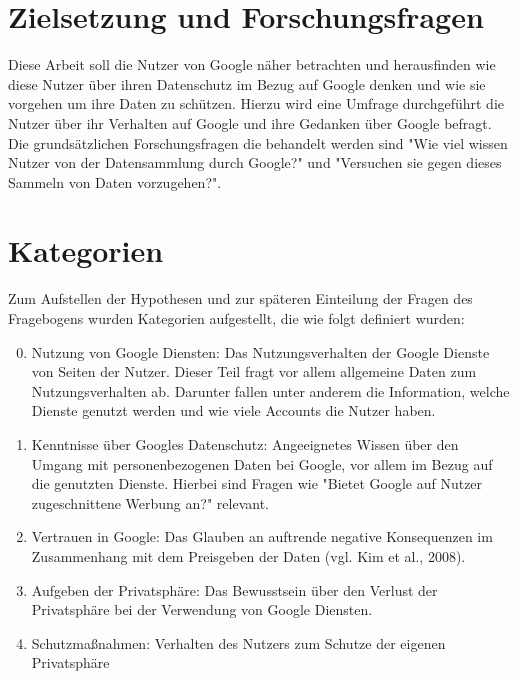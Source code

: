 \section{Zielsetzung und Forschungsfragen}
Diese Arbeit soll die Nutzer von Google näher betrachten und herausfinden wie diese Nutzer über ihren Datenschutz im Bezug auf Google denken und wie sie vorgehen um ihre Daten zu schützen. Hierzu wird eine Umfrage durchgeführt die Nutzer über ihr Verhalten auf Google und ihre Gedanken über Google befragt.
Die grundsätzlichen Forschungsfragen die behandelt werden sind "Wie viel wissen Nutzer von der Datensammlung durch Google?" und "Versuchen sie gegen dieses Sammeln von Daten vorzugehen?". 

\section{Kategorien}
Zum Aufstellen der Hypothesen und zur späteren Einteilung der Fragen des Fragebogens wurden Kategorien aufgestellt, die wie folgt definiert wurden:
\begin{enumerate}
\setcounter{enumi}{-1}
\item Nutzung von Google Diensten: Das Nutzungsverhalten der Google Dienste von Seiten der Nutzer. Dieser Teil fragt vor allem allgemeine Daten zum Nutzungsverhalten ab. Darunter fallen unter anderem die Information, welche Dienste genutzt werden und wie viele Accounts die Nutzer haben.
\item Kenntnisse über Googles Datenschutz: Angeeignetes Wissen über den Umgang mit personenbezogenen Daten bei Google, vor allem im Bezug auf die genutzten Dienste. Hierbei sind Fragen wie "Bietet Google auf Nutzer zugeschnittene Werbung an?" relevant.
\item Vertrauen in Google: Das Glauben an auftrende negative Konsequenzen im Zusammenhang mit dem Preisgeben der Daten (vgl. Kim et al., 2008).
\item Aufgeben der Privatsphäre: Das Bewusstsein über den Verlust der Privatsphäre bei der Verwendung von Google Diensten.
\item Schutzmaßnahmen: Verhalten des Nutzers zum Schutze der eigenen Privatsphäre
\end{enumerate}

